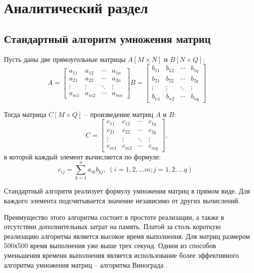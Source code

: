 \section{Аналитический раздел \hfill}
\vspace{\baselineskip}


\subsection{Стандартный алгоритм умножения матриц}

Пусть даны две прямоугольные матрицы $A[M \times N]$ и $B[N \times Q]$:
$$
A = 
\begin{bmatrix} 
	a_{11} & a_{12} & \cdots & a_{1n} \\
	a_{21} & a_{22} & \cdots & a_{2n} \\ 
	\vdots & \vdots & \ddots & \vdots \\ 
	a_{m1} & a_{m2} & \cdots & a_{mn}
\end{bmatrix}
B =   
\begin{bmatrix} 
	b_{11} & b_{12} & \cdots & b_{1q} \\
	b_{21} & b_{22} & \cdots & b_{2q} \\ 
	\vdots & \vdots & \ddots & \vdots \\ 
	b_{n1} & b_{n2} & \cdots & b_{nq}
\end{bmatrix}
$$

Тогда матрица $C[M \times Q]$ -- произведение матриц $A$ и $B$:
$$
C = 
\begin{bmatrix} 
	c_{11} & c_{12} & \cdots & c_{1q} \\
	c_{21} & c_{22} & \cdots & c_{2q} \\ 
	\vdots & \vdots & \ddots & \vdots \\ 
	c_{m1} & c_{m2} & \cdots & c_{mq}
\end{bmatrix},
$$
в которой каждый элемент вычисляется по формуле: 
\begin{equation}
	c_{ij} = \sum_{k=1}^n a_{ik}b_{kj}, ~(i=1, 2, \ldots m;j=1, 2, \ldots q)~~
\end{equation}

Стандартный алгоритм реализует формулу умножения матриц в прямом виде. Для каждого элемента подсчитывается значение независимо от других вычислений.

Преимущество этого алгоритма состоит в простоте реализации, а также в отсутствии дополнительных затрат на память. 
Платой за столь короткую реализацию алгоритма является высокое время выполнения.
Для матриц размером 500х500 время выполнения уже выше трех секунд. Одним из способов уменьшения времени выполнения является использование более эффективного алгоритма умножения матриц -- алгоритма Винограда \cite{article_matrix_4}.


